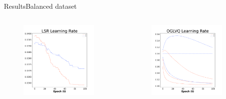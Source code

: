 \documentclass[
	aspectratio=169,	%
	onlytextwidth,		%
	t,					%
	]{beamer}
\begin{document}
\begin{frame}[fragile]{Results}{Balanced dataset}
\begin{columns}
			\begin{column}[T]{0.33\textwidth}
				\begin{figure}
					\includegraphics[width=0.9\textwidth]{myfigs/LSR_b.png}
				\end{figure}
			\end{column}
		
			\begin{column}[T]{0.33\textwidth}
				\begin{figure}
					\includegraphics[width=0.9\textwidth]{myfigs/OGLVQ_b.png}
				\end{figure}
			\end{column}
		
			
		\end{columns}
		
\centering		\color{red}{Be careful with y-axis, since they do not share common size} %
	
	\end{frame}
	
\end{document}
